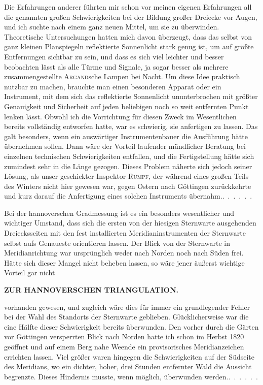 \par\noindent\hspace*{\parindent}Die Erfahrungen anderer führten mir schon vor meinen eigenen
Erfahrungen all die genannten großen Schwierigkeiten bei der Bildung großer
Dreiecke vor Augen, und ich suchte nach einem ganz neuen Mittel, um sie zu
überwinden. Theoretische Untersuchungen hatten mich davon überzeugt, dass
das selbst von ganz kleinen Planspiegeln reflektierte Sonnenlicht stark genug ist,
um auf größte Entfernungen sichtbar zu sein, und dass es sich viel leichter und
besser beobachten lässt als alle Türme und Signale, ja sogar besser als mehrere
zusammengestellte \textsc{Argand}sche Lampen bei Nacht. Um diese Idee praktisch
nutzbar zu machen, brauchte man einen besonderen Apparat oder ein Instrument,
mit dem sich das reflektierte Sonnenlicht ununterbrochen mit größter Genauigkeit
und Sicherheit auf jeden beliebigen noch so weit entfernten Punkt lenken lässt.
Obwohl ich die Vorrichtung für diesen Zweck im Wesentlichen bereits vollständig
entworfen hatte, war es schwierig, sie anfertigen zu lassen. Das galt besonders,
wenn ein auswärtiger Instrumentenbauer die Ausführung hätte übernehmen sollen.
Dann wäre der Vorteil laufender mündlicher Beratung bei einzelnen technischen
Schwierigkeiten entfallen, und die Fertigstellung hätte sich zumindest sehr in
die Länge gezogen. Dieses Problem näherte sich jedoch seiner Lösung, als unser
geschickter Inspektor \textsc{Rumpf}, der während eines großen Teils des Winters
nicht hier gewesen war, gegen Ostern nach Göttingen zurückkehrte und kurz
darauf die Anfertigung eines solchen Instruments \mbox{übernahm.\enspace\mbox{.\ .\ .\ .\ .\ .}}

\par\noindent\hspace*{\parindent}Bei der hannoverschen Gradmessung ist es ein besonders wesentlicher und
wichtiger Umstand, dass sich die ersten von der hiesigen Sternwarte ausgehenden Dreiecksseiten
mit den fest installierten Meridianinstrumenten der Sternwarte selbst aufs
Genaueste orientieren lassen. Der Blick von der Sternwarte in Meridianrichtung
war ursprünglich weder nach Norden noch nach Süden frei. Hätte sich
dieser Mangel nicht beheben lassen, so wäre jener äußerst wichtige Vorteil
gar nicht
\par\clearpage

\noindent\null\hfill{\small\textbf{ZUR HANNOVERSCHEN TRIANGULATION.}}\hfill{}\par\medskip
\noindent vorhanden gewesen, und zugleich wäre dies für immer ein grundlegender
Fehler bei der Wahl des Standorts der Sternwarte geblieben. Glücklicherweise
war die eine Hälfte dieser Schwierigkeit bereits überwunden. Den vorher durch
die Gärten vor Göttingen versperrten Blick nach Norden hatte ich schon im
Herbst 1820 geöffnet und auf einem Berg nahe Weende ein provisorisches
Meridianzeichen errichten lassen. Viel größer waren hingegen die Schwierigkeiten
auf der Südseite des Meridians, wo ein dichter, hoher, drei Stunden entfernter
Wald die Aussicht begrenzte. Dieses Hindernis musste, wenn möglich, überwunden
\mbox{werden.\enspace\mbox{.\ .\ .\ .\ .\ .}}

